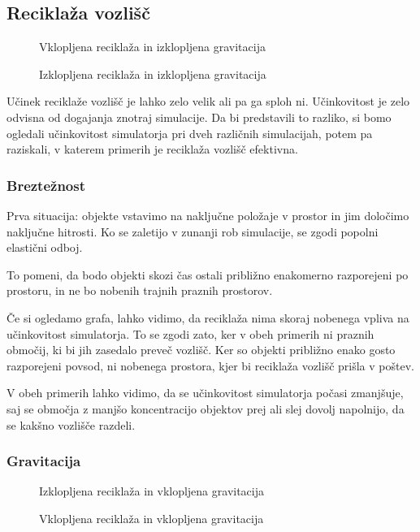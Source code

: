 \documentclass[a4paper,12pt]{article}
\begin{document}
\subsection{Reciklaža vozlišč}\label{reciklaza}
\begin{figure}
    \caption{Vklopljena reciklaža in izklopljena gravitacija}
    \vspace{0.5cm}
    \caption{Izklopljena reciklaža in izklopljena gravitacija}
\end{figure}
Učinek reciklaže vozlišč je lahko zelo velik ali pa ga sploh ni. Učinkovitost je zelo odvisna od dogajanja znotraj
simulacije. Da bi predstavili to razliko, si bomo ogledali učinkovitost simulatorja pri dveh različnih simulacijah,
potem pa raziskali, v katerem primerih je reciklaža vozlišč efektivna.
\subsubsection{Breztežnost}
Prva situacija: objekte vstavimo na naključne položaje v prostor in jim določimo naključne hitrosti. Ko 
se zaletijo v zunanji rob simulacije, se zgodi popolni elastični odboj.

To pomeni, da bodo objekti skozi čas ostali približno enakomerno razporejeni po prostoru,
in ne bo nobenih trajnih praznih prostorov.

Če si ogledamo grafa, lahko vidimo, da reciklaža nima skoraj nobenega vpliva na učinkovitost simulatorja.
To se zgodi zato, ker v obeh primerih ni praznih območij, ki bi jih zasedalo preveč vozlišč.
Ker so objekti približno enako gosto razporejeni povsod, ni nobenega prostora, kjer bi reciklaža vozlišč prišla v poštev.

V obeh primerih lahko vidimo, da se učinkovitost simulatorja počasi zmanjšuje, saj se območja
z manjšo koncentracijo objektov prej ali slej dovolj napolnijo, da se kakšno vozlišče razdeli.

\clearpage

\subsubsection{Gravitacija}

\begin{figure}
    \caption{Izklopljena reciklaža in vklopljena gravitacija}%
    \label{fig:recycling_no_grav}
    \vspace{0.5cm}
    \caption{Vklopljena reciklaža in vklopljena gravitacija}%
    \label{fig:recycling_yes_grav}
\end{figure}
\end{document}

